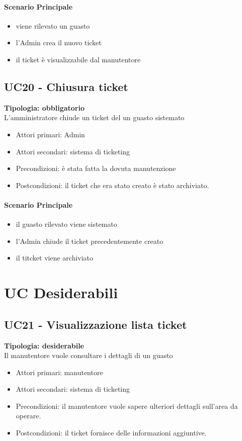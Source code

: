 \documentclass[12pt]{article}
\begin{document}
\paragraph{Scenario Principale}
\begin{itemize}
	\item viene rilevato un guasto
	\item l'Admin crea il nuovo ticket
	\item il ticket è visualizzabile dal manutentore
\end{itemize}


\subsection{UC20 - Chiusura ticket}
\textbf{Tipologia: obbligatorio}\\
L'amministratore chiude un ticket del un guasto sistemato
\begin{itemize}
	\item Attori primari: Admin
	\item Attori secondari: sistema di ticketing
	\item Precondizioni: è stata fatta la dovuta manutenzione
	\item Postcondizioni: il ticket che era stato creato è stato archiviato. 
\end{itemize}
\paragraph{Scenario Principale}
\begin{itemize}
	\item il guasto rilevato viene sistemato
	\item l'Admin chiude il ticket precedentemente creato
	\item il titcket viene archiviato
\end{itemize}


\section{UC Desiderabili}

\subsection{UC21 - Visualizzazione lista ticket}
\textbf{Tipologia: desiderabile}\\
Il manutentore vuole consultare i dettagli di un guasto
\begin{itemize}
	\item Attori primari: manutentore
	\item Attori secondari: sistema di ticketing
	\item Precondizioni: il manutentore vuole sapere ulteriori dettagli sull'area da operare.
	\item Postcondizioni: il ticket fornisce delle informazioni aggiuntive.
\end{itemize}
\end{document}
